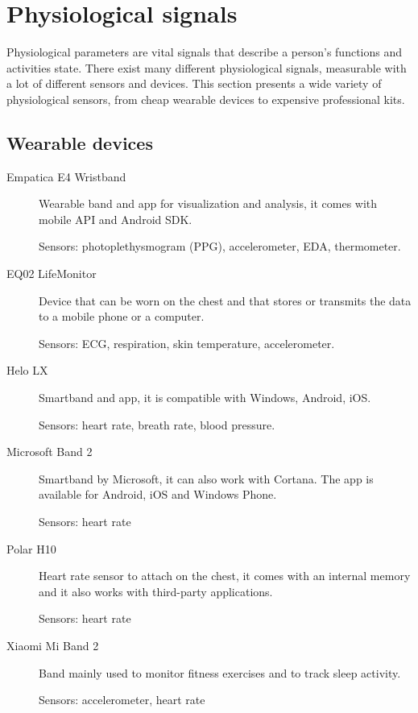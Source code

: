 \documentclass[binding=0.6cm,LaM]{sapthesis}
\begin{document}
\section{Physiological signals}
Physiological parameters are vital signals that describe a person's functions and activities state. There exist many different physiological signals, measurable with a lot of different sensors and devices. This section presents a wide variety of physiological sensors, from cheap wearable devices to expensive professional kits.

\subsection{Wearable devices}

\begin{description}

\item[Empatica E4 Wristband]
Wearable band and app for visualization and analysis, it comes with mobile API and Android SDK. 

Sensors: photoplethysmogram (PPG), accelerometer, EDA, thermometer.

\item[EQ02 LifeMonitor]
Device that can be worn on the chest and that stores or transmits the data to a mobile phone or a computer.

Sensors: ECG, respiration, skin temperature, accelerometer.

\item[Helo LX]
Smartband and app, it is compatible with Windows, Android, iOS.

Sensors: heart rate, breath rate, blood pressure.

\item[Microsoft Band 2]
Smartband by Microsoft, it can also work with Cortana. The app is available for Android, iOS and Windows Phone.

Sensors: heart rate

\item[Polar H10]
Heart rate sensor to attach on the chest, it comes with an internal memory and it also works with third-party applications. 

Sensors: heart rate

\item[Xiaomi Mi Band 2]
Band mainly used to monitor fitness exercises and to track sleep activity. 

Sensors: accelerometer, heart rate

\end{description}
\end{document}
